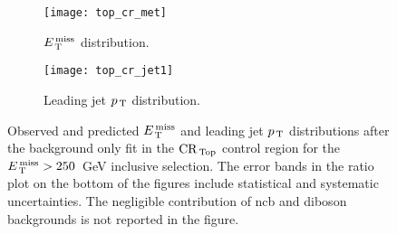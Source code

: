 \begin{figure}[!htb]
  \centering
  \begin{subfigure}[t]{.48\linewidth}
    \texttt{[image: top\_cr\_met]}
    \caption{$E_\mathrm{\, T}^\mathrm{\, miss}$ distribution.}
    \label{fig:top_cr_et_miss}
  \end{subfigure}
  \begin{subfigure}[t]{.48\linewidth}
    \texttt{[image: top\_cr\_jet1]}
    \caption{Leading jet $p_\mathrm{\, T}$ distribution.}
    \label{fig:top_cr_jet1}
  \end{subfigure}
  \caption{Observed and predicted $E_\mathrm{\, T}^\mathrm{\, miss}$ and leading jet $p_\mathrm{\, T}$ distributions
    after the background only fit in the $\mathrm{CR}_\mathrm{\, Top}$ control region for the
    $E_\mathrm{\, T}^\mathrm{\, miss} > 250$~GeV inclusive selection. The error bands in the ratio plot on
    the bottom of the figures include statistical and systematic
    uncertainties. The negligible contribution of \gls{ncb} and diboson
    backgrounds is not reported in the figure.}
  \label{fig:top_plots}
\end{figure}

